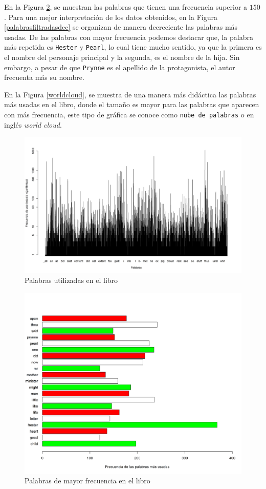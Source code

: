 \documentclass{article}
\begin{document}
En la Figura \ref{palabrasfiltradas}, se muestran las palabras que tienen una frecuencia superior a $150$. Para una mejor interpretación de los datos obtenidos, en la Figura \ref{palabrasfiltradasdec} se organizan de manera decreciente las palabras más usadas. De las palabras con mayor frecuencia podemos destacar que, la palabra más repetida es \texttt{Hester} y \texttt{Pearl}, lo cual tiene mucho sentido, ya que la primera es el nombre del personaje principal y la segunda, es el nombre de la hija. Sin embargo, a pesar de que \texttt{Prynne} es el apellido de la protagonista, el autor frecuenta más su nombre. 

En la Figura \ref{worldcloud}, se muestra de una manera más didáctica las palabras más usadas en el libro, donde el tamaño es mayor para las palabras que aparecen con más frecuencia, este tipo de gráfica se conoce como \texttt{nube de palabras} o en inglés \textit{world cloud}.

\begin{figure}
\centering
\includegraphics[scale=0.5]{Figures/palabrasEnElTexto.png}
\caption{Palabras utilizadas en el libro}
\label{palabras}
\end{figure}

\begin{figure}
\centering
\includegraphics[scale=0.6]{Figures/palabrasFiltradas.png}
\caption{Palabras de mayor frecuencia en el libro}
\label{palabrasfiltradas}
\end{figure}
\end{document}
